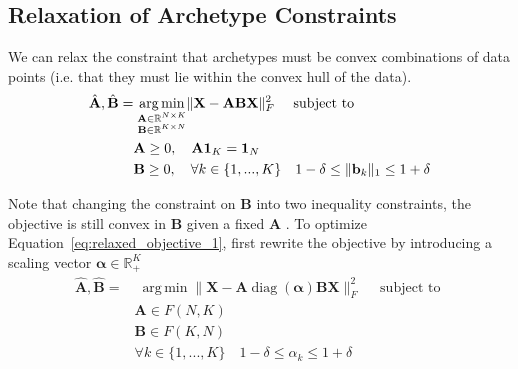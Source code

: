 \documentclass[oneside]{article}
\DeclareMathOperator*{\argmin}{arg\,min}
\begin{document}
\subsection{Relaxation of Archetype Constraints}
\label{subsec:relaxation_archetype_constraints}

We can relax the constraint that archetypes must be convex combinations of data points (i.e. that they must lie within the convex hull of the data).
\begin{equation}
\label{eq:relaxed_objective_1}
    \begin{aligned}
        \hat{\mathbf{A}}, \hat{\mathbf{B}} =& \; \underset{\begin{subarray}{c} \mathbf{A} \in \mathbb{R}^{N \times K} \\
        \mathbf{B} \in \mathbb{R}^{K \times N} \end{subarray}}{\argmin}
        \| {\mathbf{X}} - {\mathbf{A}} \mathbf{B} \mathbf{X}\|_F^2 \quad \text{ subject to } \\
        & \mathbf{A} \geq 0, \quad \mathbf{A} \mathbf{1}_K = \mathbf{1}_N \\
        & \mathbf{B} \geq 0, \quad \forall k \in \{1, ..., K\} \quad 1 - \delta \leq \| \mathbf{b}_k \|_1 \leq 1 + \delta
    \end{aligned}
\end{equation}

Note that changing the constraint on $\mathbf{B}$ into two inequality constraints, the objective is still convex in $\mathbf{B}$ given a fixed $\mathbf{A}$ \autocite{morupArchetypalAnalysisMachine2012}. To optimize Equation~\ref{eq:relaxed_objective_1}, \textcite{morupArchetypalAnalysisMachine2012} first rewrite the objective by introducing a scaling vector $\boldsymbol{\alpha} \in \mathbb{R}_+^K$
\begin{equation}
\label{eq:relaxed_objective_2}
    \begin{aligned}
        \hat{\mathbf{A}}, \hat{\mathbf{B}} =& \; \underset{}{\argmin}
        \| {\mathbf{X}} - {\mathbf{A}} \operatorname{diag}(\boldsymbol{\alpha}) \mathbf{B} \mathbf{X}\|_F^2 \quad \text{ subject to } \\
        & \mathbf{A} \in F(N, K) \\
        & \mathbf{B} \in F(K, N) \\
        & \forall k \in \{1, ..., K\} \quad 1 - \delta \leq \alpha_k \leq 1 + \delta
    \end{aligned}
\end{equation}
\end{document}
